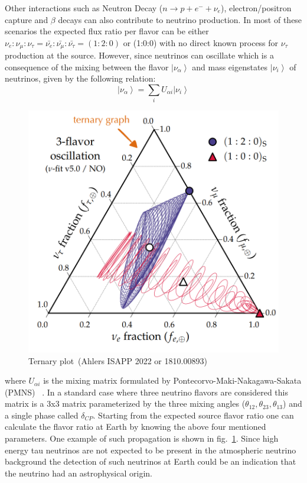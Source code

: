 Other interactions such as Neutron Decay ($n \longrightarrow p + e^- + \nu_{e} $), electron/positron capture and $\beta$ decays can also contribute to neutrino production. In most of these scenarios the expected flux ratio per flavor can be either $ \nu_{e} : \nu_{\mu} : \nu_{\tau} = \bar{\nu_{e}}: \bar{\nu_{\mu}}: \bar{\nu_{\tau}} = (1:2:0) $ or (1:0:0) with no direct known process for $\nu_{\tau}$ production at the source. However, since neutrinos can oscillate which is a consequence of the mixing between the flavor  $\left| \nu_{\alpha} \right\rangle $ and mass eigenstates $\left| \nu_{i} \right\rangle $  of neutrinos, given by the following relation:
\begin{equation}
\left| \nu_{\alpha} \right\rangle  = \sum_i U_{\alpha i} \left| \nu_{i} \right\rangle
\end{equation}
\begin{figure}[t!]
  \centering
  \includegraphics[width=14.5cm]{thesis_figures/CRnNu/Oscillation_sim_ternary.png}
  \caption{Ternary plot~\cite{}(Ahlers ISAPP 2022 or 1810.00893)}
  \label{fig:Oscillation_ternary}
\end{figure}

where $U_{\alpha i}$ is the mixing matrix formulated by Pontecorvo-Maki-Nakagawa-Sakata (PMNS) ~\cite{Pontecorvo:1957qd,10.1143/PTP.28.870}. In a standard case where three neutrino flavors are considered this matrix is a 3x3 matrix parameterized by the three mixing angles ($\theta_{12},\theta_{23},\theta_{13}$) and a single phase called $\delta_{CP}$. Starting from the expected source flavor ratio one can calculate the flavor ratio at Earth by knowing the above four mentioned parameters. One example of such propagation is shown in fig.~\ref{fig:Oscillation_ternary}. Since high energy tau neutrinos are not expected to be present in the atmospheric neutrino background the detection of such neutrinos at Earth could be an indication that the neutrino had an astrophysical origin. 

